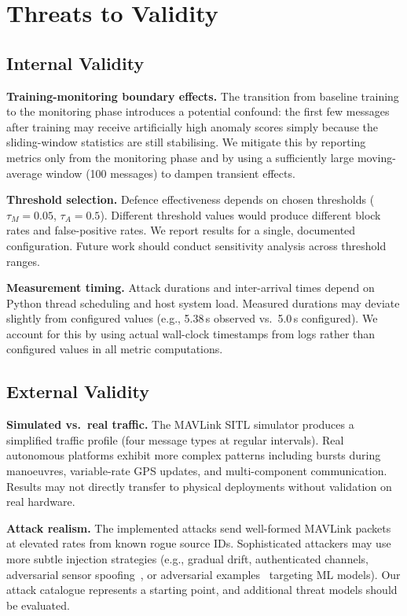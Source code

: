 \section{Threats to Validity} \label{sec:threats}

\subsection{Internal Validity}

\textbf{Training-monitoring boundary effects.}
The transition from baseline training to the monitoring phase introduces a potential confound: the first few messages after training may receive artificially high anomaly scores simply because the sliding-window statistics are still stabilising.
We mitigate this by reporting metrics only from the monitoring phase and by using a sufficiently large moving-average window (100 messages) to dampen transient effects.

\textbf{Threshold selection.}
Defence effectiveness depends on chosen thresholds ($\tau_M = 0.05$, $\tau_A = 0.5$).
Different threshold values would produce different block rates and false-positive rates.
We report results for a single, documented configuration. Future work should conduct sensitivity analysis across threshold ranges.

\textbf{Measurement timing.}
Attack durations and inter-arrival times depend on Python thread scheduling and host system load.
Measured durations may deviate slightly from configured values (e.g., 5.38\,s observed vs.\ 5.0\,s configured).
We account for this by using actual wall-clock timestamps from logs rather than configured values in all metric computations.

\subsection{External Validity}

\textbf{Simulated vs.\ real traffic.}
The MAVLink SITL simulator produces a simplified traffic profile (four message types at regular intervals).
Real autonomous platforms exhibit more complex patterns including bursts during manoeuvres, variable-rate GPS updates, and multi-component communication.
Results may not directly transfer to physical deployments without validation on real hardware.

\textbf{Attack realism.}
The implemented attacks send well-formed MAVLink packets at elevated rates from known rogue source IDs.
Sophisticated attackers may use more subtle injection strategies (e.g., gradual drift, authenticated channels, adversarial sensor spoofing~\cite{sun2020lidar}, or adversarial examples~\cite{goodfellow2015adversarial, he2023advml} targeting ML models).
Our attack catalogue represents a starting point, and additional threat models should be evaluated.

